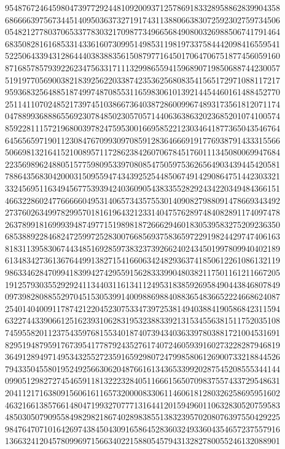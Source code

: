 {{    9548767246459804739772924481092009371257869183328958862839904358 ~
    6866663975673445140950363732719174311388066383072592302759734506 ~
    0548212778037065337783032170987734966568490800326988506741791464 ~
    6835082816168533143361607309951498531198197337584442098416559541 ~
    5225064339431286444038388356150879771645017064706751877456059160 ~
    8716857857939226234756331711132998655941596890719850688744230057 ~
    5191977056900382183925622033874235362568083541565172971088117217 ~
    9593683256488518749974870855311659830610139214454460161488452770 ~
    2511411070248521739745103866736403872860099674893173561812071174 ~
    0478899368886556923078485023057057144063638632023685201074100574 ~
    8592281115721968003978247595300166958522123034641877365043546764 ~
    6456565971901123084767099309708591283646669191776938791433315566 ~
    5066981321641521008957117286238426070678451760111345080069947684 ~
    2235698962488051577598095339708085475059753626564903439445420581 ~
    7886435683042000315095594743439252544850674914290864751442303321 ~
    3324569511634945677539394240360905438335528292434220349484366151 ~
    4663228602477666660495314065734357553014090827988091478669343492 ~
    2737602634997829957018161964321233140475762897484082891174097478 ~
    2637899181699939487497715198981872666294601830539583275209236350 ~
    6853889228468247259972528300766856937583659722919824429747406163 ~
    8183113958306744348516928597383237392662402434501997809940402189 ~
    6134834273613676449913827154166063424829363741850612261086132119 ~
    9863346284709941839942742955915628333990480382117501161211667205 ~
    1912579303552929241134403116134112495318385926958490443846807849 ~
    0973982808855297045153053991400988698840883654836652224668624087 ~
    2540140400911787421220452307533473972538149403884190586842311594 ~
    6322744339066125162393106283195323883392131534556381511752035108 ~
    7459558201123754359768155340187407394340363397803881721004531691 ~
    8295194879591767395417787924352761740724605939160273228287946819 ~
    3649128949714953432552723591659298072479985806126900733218844526 ~
    7943350455801952492566306204876616134365339920287545208555344144 ~
    0990512982727454659118132223284051166615650709837557433729548631 ~
    2041121716380915606161165732000083306114606181280326258695951602 ~
    4632166138576614804719932707771316441201594960110632830520759583 ~
    4850305079095584982982186740289838551383239570208076397550429225 ~
    9847647071016426974384504309165864528360324933604354657237557916 ~
    1366324120457809969715663402215880545794313282780055246132088901 ~
}}
